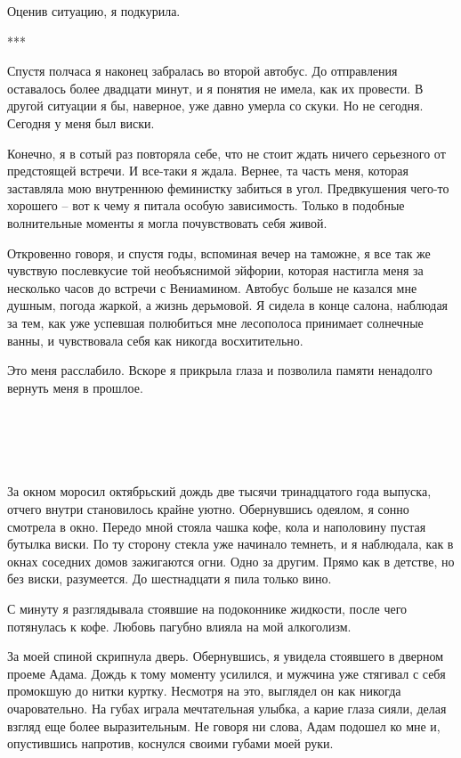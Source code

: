 \documentclass[
]{book}
\begin{document}
Оценив ситуацию, я подкурила.

***

Спустя полчаса я наконец забралась во второй автобус. До отправления оставалось более двадцати минут, и я понятия не имела, как их провести. В другой ситуации я бы, наверное, уже давно умерла со скуки. Но не сегодня. Сегодня у меня был виски.

Конечно, я в сотый раз повторяла себе, что не стоит ждать ничего серьезного от предстоящей встречи. И все-таки я ждала. Вернее, та часть меня, которая заставляла мою внутреннюю феминистку забиться в угол. Предвкушения чего-то хорошего -- вот к чему я питала особую зависимость. Только в подобные волнительные моменты я могла почувствовать себя живой.

Откровенно говоря, и спустя годы, вспоминая вечер на таможне, я все так же чувствую послевкусие той необъяснимой эйфории, которая настигла меня за несколько часов до встречи с Вениамином. Автобус больше не казался мне душным, погода жаркой, а жизнь дерьмовой. Я сидела в конце салона, наблюдая за тем, как уже успевшая полюбиться мне лесополоса принимает солнечные ванны, и чувствовала себя как никогда восхитительно.

Это меня расслабило. Вскоре я прикрыла глаза и позволила памяти ненадолго вернуть меня в прошлое.

\hypertarget{chapter-6}{%
\chapter{~}\label{chapter-6}}

За окном моросил октябрьский дождь две тысячи тринадцатого года выпуска, отчего внутри становилось крайне уютно. Обернувшись одеялом, я сонно смотрела в окно. Передо мной стояла чашка кофе, кола и наполовину пустая бутылка виски. По ту сторону стекла уже начинало темнеть, и я наблюдала, как в окнах соседних домов зажигаются огни. Одно за другим. Прямо как в детстве, но без виски, разумеется. До шестнадцати я пила только вино.

С минуту я разглядывала стоявшие на подоконнике жидкости, после чего потянулась к кофе. Любовь пагубно влияла на мой алкоголизм.

За моей спиной скрипнула дверь. Обернувшись, я увидела стоявшего в дверном проеме Адама. Дождь к тому моменту усилился, и мужчина уже стягивал с себя промокшую до нитки куртку. Несмотря на это, выглядел он как никогда очаровательно. На губах играла мечтательная улыбка, а карие глаза сияли, делая взгляд еще более выразительным. Не говоря ни слова, Адам подошел ко мне и, опустившись напротив, коснулся своими губами моей руки.
\end{document}
